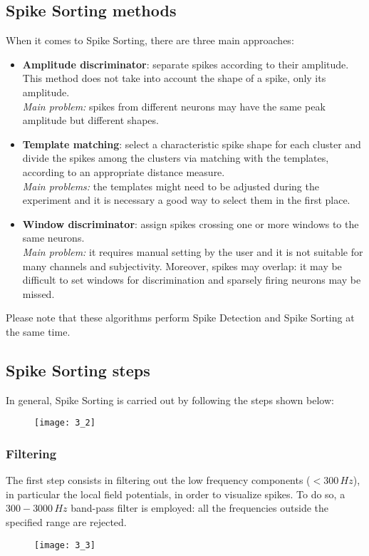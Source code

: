 \subsection{Spike Sorting methods}
When it comes to Spike Sorting, there are three main approaches:
\begin{itemize}
    \item \textbf{Amplitude discriminator}: separate spikes according to their amplitude.
          This method does not take into account the shape of a spike, only its amplitude.\\
          \textit{Main problem:} spikes from different neurons may have the same peak
          amplitude but different shapes.
    \item \textbf{Template matching}: select a characteristic spike shape for each
          cluster and divide the spikes among the clusters via matching with the templates,
          according to an appropriate distance measure.\\
          \textit{Main problems:} the templates might need to be adjusted during the
          experiment and it is necessary a good way to select them in the first place.
    \item \textbf{Window discriminator}: assign spikes crossing one or more windows to
          the same neurons.\\
          \textit{Main problem:} it requires manual setting by the user and it is not
          suitable for many channels and subjectivity. Moreover, spikes may overlap: it may
          be difficult to set windows for discrimination and sparsely firing neurons may be
          missed.
\end{itemize}
Please note that these algorithms perform Spike Detection and Spike Sorting at the same
time.\\

\subsection{Spike Sorting steps}
In general, Spike Sorting is carried out by following the steps shown below:
\begin{figure}[H]
    \texttt{[image: 3\_2]}
    \centering
\end{figure}
\subsubsection{Filtering}
The first step consists in filtering out the low frequency components (\(< 300 \,Hz\)),
in particular the local field potentials, in order to visualize spikes. To do so, a
\(300-3000 \,Hz\) band-pass filter is employed: all the frequencies outside the
specified range are rejected.
\begin{figure}[H]
    \texttt{[image: 3\_3]}
    \centering
\end{figure}
